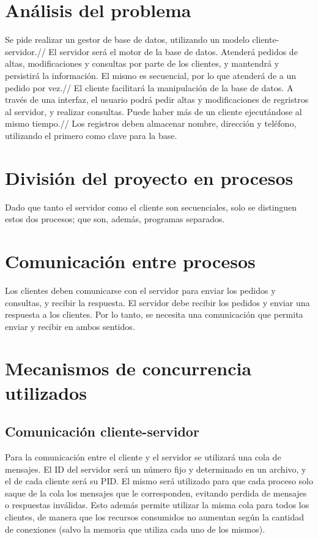 \documentclass[11pt,spanish,a4paper,openany,notitlepage]{article}
\begin{document}
\newpage
\tableofcontents
\newpage

\section{Análisis del problema}

Se pide realizar un gestor de base de datos, utilizando un modelo cliente-servidor.//
El servidor será el motor de la base de datos. Atenderá pedidos de altas, modificaciones y consultas por parte de los clientes, y mantendrá y persistirá la información. El mismo es secuencial, por lo que atenderá de a un pedido por vez.//
El cliente facilitará la manipulación de la base de datos. A través de una interfaz, el usuario podrá pedir altas y modificaciones de regristros al servidor, y realizar consultas. Puede haber más de un cliente ejecutándose al mismo tiempo.//
Los registros deben almacenar nombre, dirección y teléfono, utilizando el primero como clave para la base.

\section{División del proyecto en procesos}

Dado que tanto el servidor como el cliente son secuenciales, solo se distinguen estos dos procesos; que son, además, programas separados.

\section{Comunicación entre procesos}

Los clientes deben comunicarse con el servidor para enviar los pedidos y consultas, y recibir la respuesta. El servidor debe recibir los pedidos y enviar una respuesta a los clientes. Por lo tanto, se necesita una comunicación que permita enviar y recibir en ambos sentidos.

\section{Mecanismos de concurrencia utilizados}

\subsection{Comunicación cliente-servidor}

Para la comunicación entre el cliente y el servidor se utilizará una cola de mensajes. El ID del servidor será un número fijo y determinado en un archivo, y el de cada cliente será su PID. El mismo será utilizado para que cada proceso solo saque de la cola los mensajes que le corresponden, evitando perdida de mensajes o respuestas inválidas. Esto además permite utilizar la misma cola para todos los clientes, de manera que los recursos consumidos no aumentan según la cantidad de conexiones (salvo la memoria que utiliza cada uno de los mismos).
\end{document}

